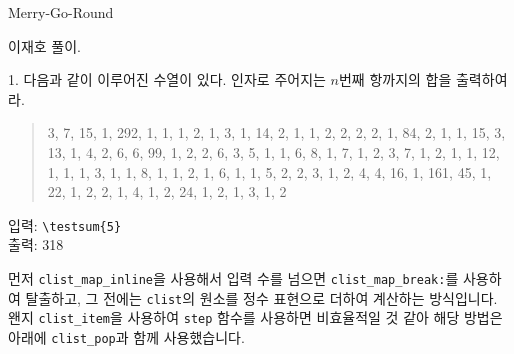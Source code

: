 \documentclass[a4paper,amsmath]{oblivoir}
\begin{document}
\begin{intro}[3]
  Merry-Go-Round
\end{intro}

이재호 풀이.
\medskip

\begin{questionp}
   1. 다음과 같이 이루어진 수열이 있다. 인자로 주어지는 $n$번째 항까지의 합을 출력하여라.
  \begin{quote}
    3, 7, 15, 1, 292, 1, 1, 1, 2, 1, 3, 1, 14, 2, 1, 1, 2, 2, 2, 2, 1, 84, 2, 1, 1, 15, 3, 13, 1, 4, 2, 6, 6, 99, 1, 2, 2, 6, 3, 5, 1, 1, 6, 8, 1, 7, 1, 2, 3, 7, 1, 2, 1, 1, 12, 1, 1, 1, 3, 1, 1, 8, 1, 1, 2, 1, 6, 1, 1, 5, 2, 2, 3, 1, 2, 4, 4, 16, 1, 161, 45, 1, 22, 1, 2, 2, 1, 4, 1, 2, 24, 1, 2, 1, 3, 1, 2
  \end{quote}

  \tcblower

  \begin{minipage}[t]{10cm}
    입력: \verb|\testsum{5}|\\
    출력: 318
  \end{minipage}
\end{questionp}

먼저 \verb|clist_map_inline|을 사용해서 입력 수를 넘으면
\verb|clist_map_break:|를 사용하여 탈출하고, 그 전에는 \verb|clist|의 원소를
정수 표현으로 더하여 계산하는 방식입니다.
왠지 \verb|clist_item|을 사용하여 \verb|step| 함수를 사용하면 비효율적일 것
같아 해당 방법은 아래에 \verb|clist_pop|과 함께 사용했습니다.
\end{document}
